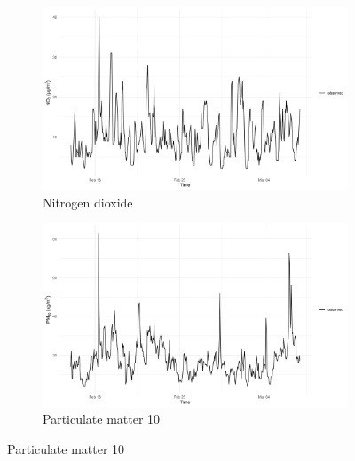          \begin{figure}[H]
            \centering
            \begin{subfigure}{0.48\linewidth}
               \centering
               \includegraphics[width=\linewidth]{../images/subset_data_no2.png}
            \caption{Nitrogen dioxide}
            \end{subfigure}
            \hfill
            \begin{subfigure}{0.48\linewidth}
               \centering
               \includegraphics[width=\linewidth]{../images/subset_data_pm10.png}
               \caption{Particulate matter 10}
            \end{subfigure}
            
            \vspace{0.5em}


\end{figure}
